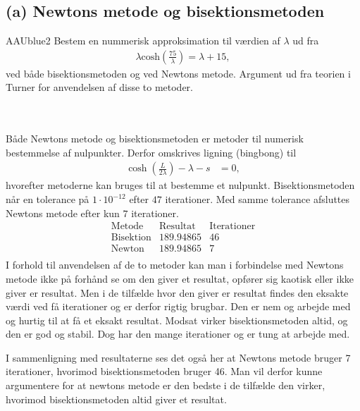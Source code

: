 \subsection*{(a) Newtons metode og bisektionsmetoden}
% 
%
\begin{color}{AAUblue2}
Bestem en nummerisk approksimation til værdien af $\lambda$ ud fra 
\begin{align*}
\lambda \text{cosh}\left( \frac{75}{\lambda} \right) = \lambda + 15,
\end{align*}
ved både bisektionsmetoden og ved Newtons metode. 
Argument ud fra teorien i Turner for anvendelsen af disse to metoder.
\end{color}
\\\\
%
%
Både Newtons metode og bisektionsmetoden er metoder til numerisk bestemmelse af nulpunkter.
Derfor omskrives ligning (bingbong) til
%
\begin{align*}
\cosh( \frac{L}{2\lambda}) - \lambda - s &= 0,
\end{align*}
%
hvorefter metoderne kan bruges til at bestemme et nulpunkt.
Bisektionsmetoden når en tolerance på $1\cdot 10^{-12}$ efter $47$ iterationer.
Med samme tolerance afsluttes Newtons metode efter kun $7$ iterationer.
$$
\begin{array}{l|c|c}
\text{Metode} & \text{Resultat} & \text{Iterationer}\\
\hline
\text{Bisektion}	& 189.94865 & 46\\
\text{Newton}		& 189.94865 & 7\\
\end{array}
$$
I forhold til anvendelsen af de to metoder kan man i forbindelse med Newtons metode ikke på forhånd se om den giver et resultat, opfører sig kaotisk eller ikke giver er resultat. 
Men i de tilfælde hvor den giver er resultat findes den eksakte værdi ved få iterationer og er derfor rigtig brugbar. 
Den er nem og arbejde med og hurtig til at få et eksakt resultat. 
%
Modsat virker bisektionsmetoden altid, og den er god og stabil. Dog har den mange iterationer og er tung at arbejde med.

I sammenligning med resultaterne ses det også her at Newtons metode bruger 7 iterationer, hvorimod bisektionsmetoden bruger 46. 
%
Man vil derfor kunne argumentere for at newtons metode er den bedste i de tilfælde den virker, hvorimod bisektionsmetoden altid giver et resultat. 
%
